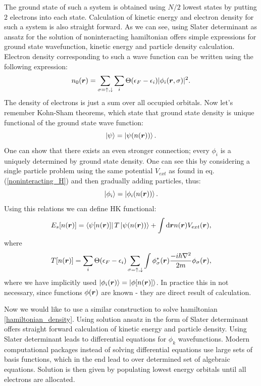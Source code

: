 \documentclass[openany, longbibliography,slovene,a4paper,12pt]{article}
\def\vec#1{\mbox{\boldmath$#1$}}
\newcommand{\dif}{\mathrm{d}}
\begin{document}
 The ground state of such a system is obtained using $N/2$ lowest states by
 putting $2$  electrons into each state. Calculation of kinetic energy and
 electron density for such a system is also straight forward. As we can see,
 using Slater  determinant as ansatz for the solution of noninteracting
 hamiltonian offers simple expressions for ground state wavefunction, kinetic
 energy and particle density  calculation. Electron density corresponding to
 such a wave function can be written using the following expression:
 \begin{equation} \label{KS_density}
   n_0(\vec r) = \sum_{\sigma=\uparrow,\downarrow}\sum_i\Theta(\epsilon_F-\epsilon_i)|\phi_i(\vec r, \sigma)|^2.
 \end{equation}
 The density of electrons is just a sum over all occupied orbitals. Now let's
 remember Kohn-Sham theorems, which state that ground state density is unique
 functional of the ground state wave function:
 \begin{equation}
   \ket{\psi}= \ket{\psi(n(\vec r))}.
 \end{equation}
 One can show that there exists an even stronger connection; every $\phi_i$ is a
 uniquely determined by ground state density. One can see this by considering a single particle problem using the same potential $V_{ext}$ as found in eq.
 (\ref{noninteracting_H}) and then gradually adding particles, thus:
 \begin{equation}
   \ket{\phi_i}= \ket{\phi_i(n(\vec r))}.
 \end{equation}
 Using this relations we can define HK functional:
 \begin{equation}
   E_s[n(\vec r)] = \bra{\psi[n(\vec r)]}T \ket{\psi(n(\vec r))} + \int \dif \vec r n(\vec r) V_{ext}(\vec r),
   \end{equation}
 where
\begin{equation} \label{KS_kinetic_term}
   T[n(\vec r)] = \sum_i\Theta(\epsilon_F-\epsilon_i)  \sum_{\sigma=\uparrow,\downarrow}\int \phi^*_\sigma(\vec r)\frac{-i\hbar\nabla^2}{2m}\phi_\sigma(\vec r),
 \end{equation}
 where we have implicitly used $\ket{\phi_i(\vec r)} = \ket{ \phi[n(\vec r)] }$.
 In practice this in not necessary, since functions $\phi(\vec r)$ are known -
 they are direct result of calculation.
 
Now we would like to use a similar construction to solve hamiltonian
\ref{hamiltonian_density}. Using solution ansatz in the form of Slater
determinant offers straight forward calculation of kinetic energy and particle
density. Using Slater determinant leads to differential equations for $\phi_k$
wavefunctions. Modern computational packages instead of solving differential
equations use large sets of basis functions, which in the end lead to
over determined set of algebraic equations. Solution is then given by populating
lowest energy orbitals until all electrons are allocated.
 
\end{document}
